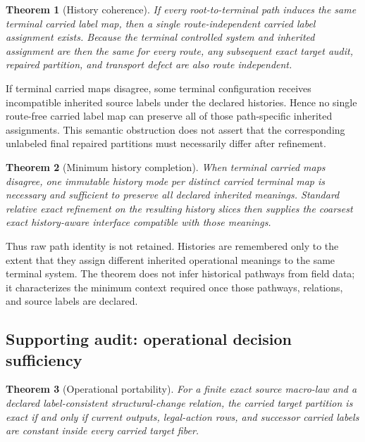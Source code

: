 \documentclass[11pt]{article}
\newtheorem{theorem}{Theorem}
\begin{document}
\setcounter{theorem}{2}
\begin{theorem}[History coherence]
If every root-to-terminal path induces the same terminal carried label map, then a single route-independent carried label assignment exists. Because the terminal controlled system and inherited assignment are then the same for every route, any subsequent exact target audit, repaired partition, and transport defect are also route independent.
\end{theorem}

If terminal carried maps disagree, some terminal configuration receives incompatible inherited source labels under the declared histories. Hence no single route-free carried label map can preserve all of those path-specific inherited assignments. This semantic obstruction does not assert that the corresponding unlabeled final repaired partitions must necessarily differ after refinement.

\begin{theorem}[Minimum history completion]
When terminal carried maps disagree, one immutable history mode per distinct carried terminal map is necessary and sufficient to preserve all declared inherited meanings. Standard relative exact refinement on the resulting history slices then supplies the coarsest exact history-aware interface compatible with those meanings.
\end{theorem}

Thus raw path identity is not retained. Histories are remembered only to the extent that they assign different inherited operational meanings to the same terminal system. The theorem does not infer historical pathways from field data; it characterizes the minimum context required once those pathways, relations, and source labels are declared.

\subsection{Supporting audit: operational decision sufficiency}
\setcounter{theorem}{0}
\begin{theorem}[Operational portability]
For a finite exact source macro-law and a declared label-consistent structural-change relation, the carried target partition is exact if and only if current outputs, legal-action rows, and successor carried labels are constant inside every carried target fiber.
\end{theorem}
\end{document}
